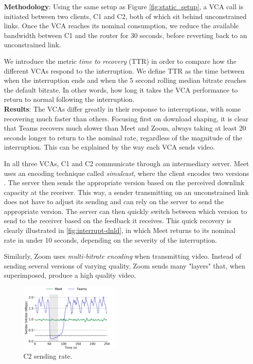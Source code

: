\noindent \textbf{Methodology}:
Using the same setup as Figure \ref{fig:static_setup}, a VCA call is initiated between two clients, C1 and C2, both of which sit behind unconstrained links. Once the VCA reaches its nominal consumption, we reduce the available bandwidth between C1 and the router for 30 seconds, before reverting back to an unconstrained link.  

We introduce the metric \textit{time to recovery} (TTR) in order to compare how the different VCAs respond to the interruption. We define TTR as the time 
between when the interruption ends and when the 5 second rolling median bitrate reaches the default bitrate. In other words, how long it takes the VCA performance to return to normal following the interruption.\\



\noindent \textbf{Results}: 
The VCAs differ greatly in their response to interruptions, with some recovering much faster than others. Focusing first on download shaping, it is clear that Teams recovers much slower than Meet and Zoom, always taking at least 20 seconds longer to return to the nominal rate, regardless of the magnitude of the interruption. This can be explained by the way each VCA sends video. 

In all three VCAs, C1 and C2 communicate through an intermediary server. Meet uses an encoding technique called \textit{simulcast}, where the client encodes two versions . The server then sends the appropriate version based on the perceived downlink capacity at the receiver. This way, a sender transmitting on an unconstrained link does not have to adjust its sending and can rely on the server to send the appropriate version. The server can then quickly switch between which version to send to the receiver based on the feedback it receives. This quick recovery is clearly illustrated in \ref{fig:interrupt-dnld}, in which Meet returns to its nominal rate in under 10 seconds, depending on the severity of the interruption.

Similarly, Zoom uses \textit{multi-bitrate encoding} when transmitting video. Instead of sending several versions of varying quality, Zoom sends many "layers" that, when superimposed, produce a high quality video. 

\begin{figure}[]
    \centering
    \includegraphics[width=0.45\textwidth,keepaspectratio]{../figures/interrupt/Interrupt-sender.pdf}
    \caption{C2 sending rate.}
    \label{fig:Interrupt-sender}
\end{figure}

